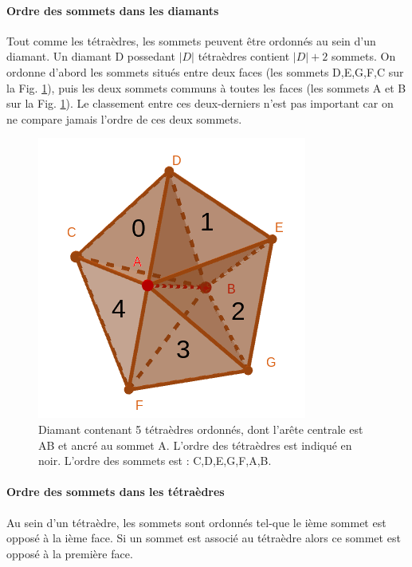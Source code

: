 \documentclass[a4paper,11pt,openany]{article}
\begin{document}
\paragraph{Ordre des sommets dans les diamants}
\label{Ordre des sommets dans les diamants}Tout comme les tétraèdres, les sommets peuvent être ordonnés au sein d'un diamant. Un diamant D possedant $|D|$ tétraèdres contient $|D|+2$ sommets. On ordonne d'abord les sommets situés entre deux faces (les sommets D,E,G,F,C sur la Fig. \ref{fig:tetra_ordonnee}), puis les deux sommets communs à toutes les faces (les sommets A et B sur la Fig. \ref{fig:tetra_ordonnee}). Le classement entre ces deux-derniers n'est pas important car on ne compare jamais l'ordre de ces deux sommets.
\begin{figure}[H]
\begin{center}
\includegraphics[scale=0.45]{Images/tetra_ordonnee}
\caption{Diamant contenant 5 tétraèdres ordonnés, dont l'arête centrale est AB et ancré au sommet A. L'ordre des tétraèdres est indiqué en noir. L'ordre des sommets est : C,D,E,G,F,A,B.}
\label{fig:tetra_ordonnee}
\end{center}
\end{figure}
\noindent
\paragraph{Ordre des sommets dans les tétraèdres}
Au sein d'un tétraèdre, les sommets sont ordonnés tel-que le ième sommet est opposé à la ième face. Si un sommet est associé au tétraèdre alors ce sommet est opposé à la première face.
\end{document}

